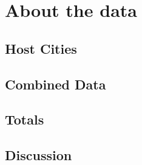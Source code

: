 \documentclass[a4 paper, 12pt]{article}
\begin{document}
\pagebreak
\appendix
\appendixpage
\addappheadtotoc
\section{About the data}

\subsection{Host Cities}


\pagebreak
\subsection{Combined Data}


\pagebreak
\subsection{Totals}



\pagebreak
\subsection{Discussion}

\end{document}
